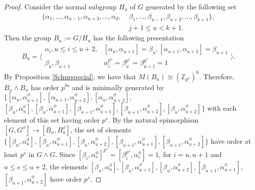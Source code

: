 \documentclass[preprint,sort&compress,12pt]{elsarticle}
\numberwithin{equation}{section}
\theoremstyle{definition}
\newcommand{\Z}{\mathbb{Z}}
\begin{document}
\begin{proof}
 Consider the normal subgroup $H_u$ of $G$ generated by the following set
 \begin{align*}
     \{  \alpha_1 , \ldots , \alpha_{u-1} ,   \alpha_{u+3} ,\ldots  ,\alpha_d, \ & \beta_1, \ldots,\beta_{u-1}, \beta_{u+2},\ldots,\beta_{k+1} \}, \\ &j+1 \leq  u < k+1.
 \end{align*}
Then the group $B_u:=G/H_u$ has the following presentation
\[ B_u=\biggl\langle 
\begin{array}{l|cl}
	 \alpha_i,u \le i \le u+2, &  [\alpha_{u},\alpha_{u+1}]=\beta_u, [\alpha_{u+1},\alpha_{u+2}]=\beta_{u+1}   \\
	\beta_u,\beta_{u+1} &\alpha_i^{p^s}=\beta_u^{p^s}=\beta_{u+1}^{p^s}=1 
    \end{array}
\biggr\rangle.\]
By Proposition \ref{Schurspecial}, we have that $M(B_u)\cong (\Z_{p^s})^6$. Therefore, ${B_u \wedge B_u}$ has order $p^{8s}$ and is minimally generated by $\{[\alpha_{u},\alpha_{u+1}^\phi],[\alpha_{u+1},\alpha_{u+2}^\phi],[\alpha_{u},\alpha_{u+2}^\phi],$\\$[\beta_u,\alpha_{u}^\phi],[\beta_u,\alpha_{u+1}^\phi], 
[\beta_{u+1},\alpha_{u+1}^\phi],[\beta_{u+1},\alpha_{u+2}^\phi],[\beta_{u},\alpha_{u+2}^\phi]\}$ with each element of this set having order $p^s$. By the natural epimorphism
 $[G,G^\phi] \to [B_u,B_u^\phi]$, the set of elements $\{[\beta_u,\alpha_{u}^\phi],[\beta_u,\alpha_{u+1}^\phi],[\beta_{u},\alpha_{u+2}^\phi],[\beta_{u+1},\alpha_{u+1}^\phi],[\beta_{u+1},\alpha_{u+2}^\phi]\}$ have order at least $p^s$ in  $G \wedge G$. Since ${[\beta_i,\alpha_e^{\phi}]^{p^s}=[\beta_i^{p^s},\alpha_e^{\phi}]=1}$, for $i=u,u+1$ and ${u\le e\le u+2}$, the elements $[\beta_u,\alpha_{u}^\phi],[\beta_u,\alpha_{u+1}^\phi],[\beta_{u},\alpha_{u+2}^\phi],[\beta_{u+1},\alpha_{u+1}^\phi],$\\$[\beta_{u+1},\alpha_{u+2}^\phi]$ have order $p^s$.


\end{proof}
\end{document}
